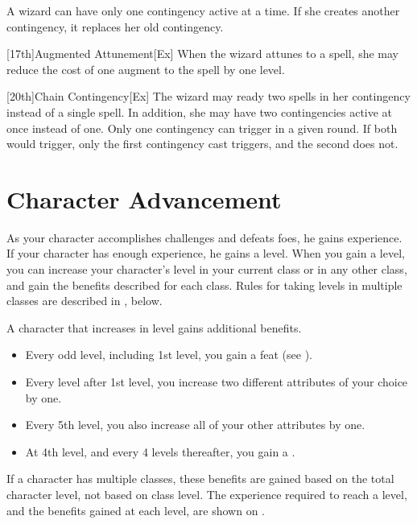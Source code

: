A wizard can have only one contingency active at a time.
If she creates another contingency, it replaces her old contingency.

[17th]{Augmented Attunement}[Ex]
When the wizard attunes to a spell, she may reduce the cost of one augment to the spell by one level.

[20th]{Chain Contingency}[Ex]
The wizard may ready two spells in her contingency instead of a single spell.
In addition, she may have two contingencies active at once instead of one.
Only one contingency can trigger in a given round.
If both would trigger, only the first contingency cast triggers, and the second does not.

\section{Character Advancement}\label{Character Advancement}

As your character accomplishes challenges and defeats foes, he gains experience.
If your character has enough experience, he gains a level.
When you gain a level, you can increase your character's level in your current class or in any other class, and gain the benefits described for each class.
Rules for taking levels in multiple classes are described in , below.

A character that increases in level gains additional benefits.
\begin{itemize}
    \item Every odd level, including 1st level, you gain a feat (see ).
    \item Every level after 1st level, you increase two different attributes of your choice by one.
    \item Every 5th level, you also increase all of your other attributes by one.
    \item At 4th level, and every 4 levels thereafter, you gain a .
\end{itemize}

If a character has multiple classes, these benefits are gained based on the total character level, not based on class level.
The experience required to reach a level, and the benefits gained at each level, are shown on .

